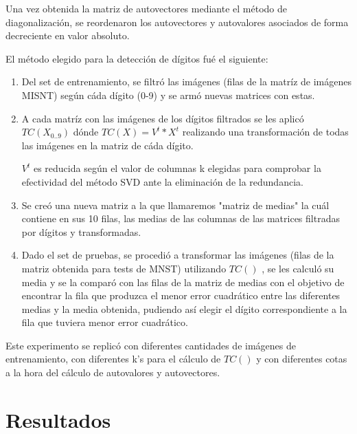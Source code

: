 \documentclass[a4paper,10pt,twoside]{article}
\begin{document}
Una vez obtenida la matriz de autovectores mediante el método de diagonalización, se reordenaron los autovectores y autovalores asociados de forma decreciente en valor absoluto.

El método elegido para la detección de dígitos fué el siguiente:
\begin{enumerate}
\item Del set de entrenamiento, se filtró las imágenes (filas de la matríz de imágenes MISNT) según cáda dígito (0-9) y se armó nuevas matrices con estas.

\item A cada matríz con las imágenes de los dígitos filtrados se les aplicó $TC(X_{0..9})$ dónde $TC(X) = V^{t} * X^{t}$ realizando una transformación de todas las imágenes en la matriz de cáda dígito.

$V^{t}$ es reducida según el valor de columnas k elegidas para comprobar la efectividad del método SVD ante la eliminación de la redundancia.

\item Se creó una nueva matriz a la que llamaremos "matriz de medias" la cuál contiene en sus 10 filas, las medias de las columnas de las matrices filtradas por dígitos y transformadas.

\item Dado el set de pruebas, se procedió a transformar las imágenes (filas de la matriz obtenida para tests de MNST) utilizando $TC()$ , se les calculó su media y se la comparó con las filas de la matriz de medias con el objetivo de encontrar la fila que produzca el menor error cuadrático entre las diferentes medias y la media obtenida, pudiendo así elegir el dígito correspondiente a la fila que tuviera menor error cuadrático.
\end{enumerate}

Este experimento se replicó con diferentes cantidades de imágenes de entrenamiento, con diferentes k's para el cálculo de $TC()$ y con diferentes cotas a la hora del cálculo de autovalores y autovectores.




\section{Resultados}
\end{document}
